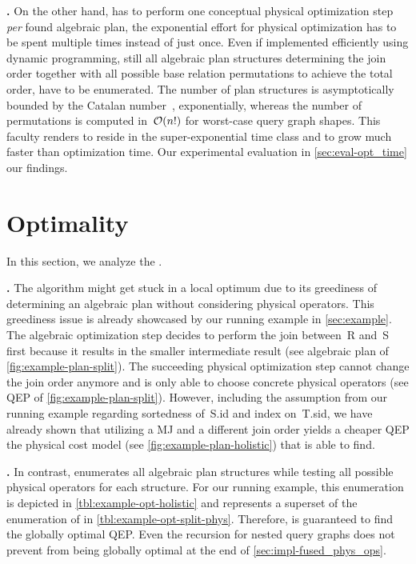 \textbf{\holistic.}
On the other hand, \holistic has to perform one conceptual physical optimization step \emph{per} found algebraic plan, \ie the exponential effort for physical optimization has to be spent multiple times instead of just once.  Even if implemented efficiently using dynamic programming, still all algebraic plan structures determining the join order together with all possible base relation permutations to achieve the total order, have to be enumerated.  The number of plan structures is asymptotically bounded by the Catalan number~\cite{book_moerkotte}, \ie exponentially, whereas the number of permutations is computed in~$\mathcal{O}(n!)$ for worst-case query graph shapes.  This faculty renders \holistic to reside in the super-exponential time class and to grow much faster than \split \wrt optimization time.  Our experimental evaluation in \autoref{sec:eval-opt_time}  our findings.

\section{Optimality}
\label{sec:optimality}

In this section, we analyze the .

\textbf{\split.}
The algorithm \split might get stuck in a local optimum due to its greediness of determining an algebraic plan without considering physical operators.  This greediness issue is already showcased by our running example in \autoref{sec:example}.  The algebraic optimization step decides to perform the join between~R and~S first because it results in the smaller intermediate result (see algebraic plan of \autoref{fig:example-plan-split}).  The succeeding physical optimization step cannot change the join order anymore and is only able to choose concrete physical operators (see QEP of \autoref{fig:example-plan-split}).  However, including the assumption from our running example regarding sortedness of~S.id and index on~T.sid, we have already shown that utilizing a MJ and a different join order yields a cheaper QEP \wrt the physical cost model (see \autoref{fig:example-plan-holistic}) that \holistic is able to find.

\textbf{\holistic.}
In contrast, \holistic enumerates all algebraic plan structures while testing all possible physical operators for each structure.  For our running example, this enumeration is depicted in \autoref{tbl:example-opt-holistic} and represents a superset of the enumeration of \split in \autoref{tbl:example-opt-split-phys}.  Therefore, \holistic is guaranteed to find the globally optimal QEP.  Even the recursion for nested query graphs does not prevent \holistic from being globally optimal  at the end of \autoref{sec:impl-fused_phys_ops}.
